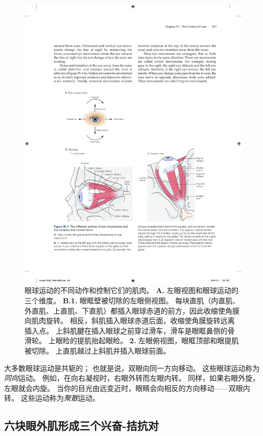 \begin{figure}[htbp]
	\centering
	\includegraphics[width=0.85\linewidth]{chap35/fig_35_1}
	\caption{眼球运动的不同动作和控制它们的肌肉。
		\textbf{A.} 左眼视图和眼球运动的三个维度。
		\textbf{B.1.} 眼眶壁被切除的左眼侧视图。
		每块直肌（内直肌、外直肌、上直肌、下直肌）都插入眼球赤道的前方，因此收缩使角膜向肌肉旋转。
		相反，斜肌插入眼球赤道后面，收缩使角膜旋转远离插入点。
		上斜肌腱在插入眼球之前穿过滑车，滑车是眼眶鼻侧的骨滑轮。
		上眼睑的提肌抬起眼睑。
		\textbf{2.} 左眼俯视图，眼眶顶部和眼提肌被切除。 
		上直肌越过上斜肌并插入眼球前面。}
	\label{fig:35_1}
\end{figure}


大多数眼球运动是共轭的；
也就是说，双眼向同一方向移动。
这些眼球运动称为\textit{同向}运动。
例如，在向右凝视时，右眼外转而左眼内转。
同样，如果右眼外旋，左眼就会内旋。
当你的目光由远变近时，眼睛会向相反的方向移动——双眼内转。
这些运动称为\textit{聚散}运动。



\subsection{六块眼外肌形成三个兴奋-拮抗对}

